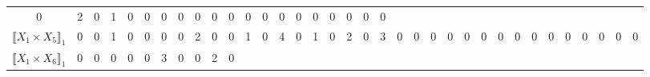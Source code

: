 \documentclass[12pt]{article}
\theoremstyle{definition}
\theoremstyle{remark}
\begin{document}
{\begin{table}[H]
\begin{adjustbox}{angle=90}
{\begin{tabular}{c||c|c|c|c|c|c|c|c|c|c|c|c|c|c|c|c|c|c|c|c|c|c|c|c|c|c|c|c|c|c|c|c|c|c}
0  & %
2  & %
0  & %
1  & %
0  & %
0  & %
0  & %
0  & %
0  & %
0  & %
0  & %
0  & %
0  & %
0  & %
0  & %
0  & %
0  & %
0  & %
0  & %
0   %
\\
$\llbracket X_1 \times X_5 \rrbracket_1$ &
0  & %
0  & %
1  & %
0  & %
0  & %
0  & %
0  & %
2  & %
0  & %
0  & %
1  & %
0  & %
4  & %
0  & %
1  & %
0  & %
2  & %
0  & %
3  & %
0  & %
0  & %
0  & %
0  & %
0  & %
0  & %
0  & %
0  & %
0  & %
0  & %
0  & %
0  & %
0  & %
0  & %
0   %
\\
$\llbracket X_1 \times X_6 \rrbracket_1$ &
0  & %
0  & %
0  & %
0  & %
0  & %
3  & %
0  & %
0  & %
2  & %
0  & %

\end{tabular}}
\end{adjustbox}
\end{table}}
\end{document}
